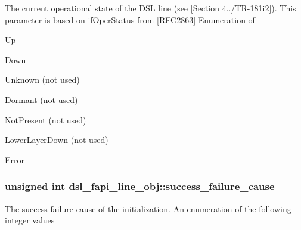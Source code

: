 The current operational state of the D\-S\-L line (see \mbox{[}Section 4../\-T\-R-\/181i2\mbox{]}). This parameter is based on if\-Oper\-Status from \mbox{[}R\-F\-C2863\mbox{]} Enumeration of
\begin{DoxyItemize}
\item Up
\item Down
\item Unknown (not used)
\item Dormant (not used)
\item Not\-Present (not used)
\item Lower\-Layer\-Down (not used)
\item Error 
\end{DoxyItemize}\hypertarget{structdsl__fapi__line__obj_a5c1ff715c2f106c556ce842423b9e4d5}{
\subsubsection[{success\-\_\-failure\-\_\-cause}]{\setlength{\rightskip}{0pt plus 5cm}unsigned int dsl\-\_\-fapi\-\_\-line\-\_\-obj\-::success\-\_\-failure\-\_\-cause}}\label{structdsl__fapi__line__obj_a5c1ff715c2f106c556ce842423b9e4d5}
The success failure cause of the initialization. An enumeration of the following integer values
